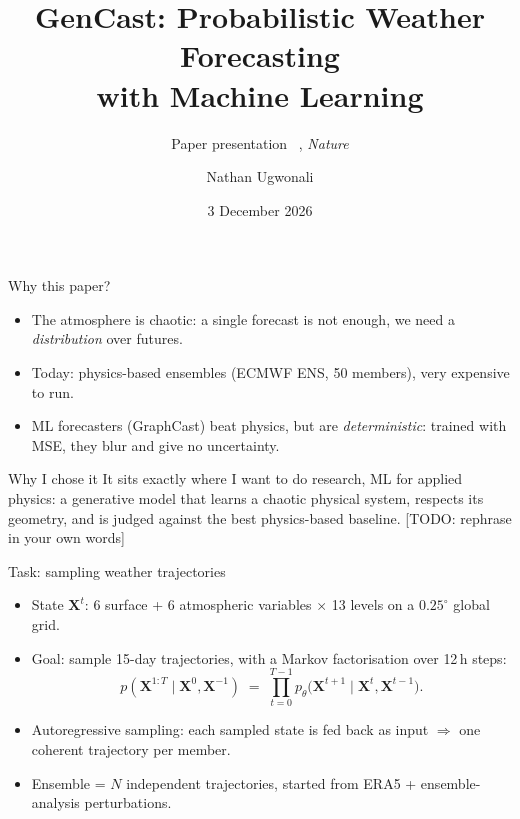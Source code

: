 \documentclass[aspectratio=169,11pt]{beamer}
\title[GenCast]{GenCast: Probabilistic Weather Forecasting\\with Machine Learning}
\subtitle{Paper presentation \textbar\ \citet{price2025gencast}, \emph{Nature}}
\author[N.\ Ugwonali]{Nathan Ugwonali}
\institute{MVA \textbar\ ALTEGRAD: Advanced Learning for Text and Graph Data}
\date{3 December 2026}
\newcommand{\verify}[1]{\colorbox{yellow!50}{#1}}
\newcommand{\todo}[1]{{\color{red}\footnotesize[TODO: #1]}}
\newcommand{\X}{\mathbf{X}}
\begin{document}
\begin{frame}[plain]
  \titlepage
\end{frame}

\begin{frame}{Why this paper?}
  \begin{itemize}
    \item The atmosphere is \alert{chaotic}: a single forecast is not enough, we need a \emph{distribution} over futures.
    \item Today: physics-based \alert{ensembles} (ECMWF ENS, \verify{50 members}), very expensive to run.
    \item ML forecasters (GraphCast) beat physics, but are \emph{deterministic}: trained with MSE, they blur and give no uncertainty.
  \end{itemize}
  \vfill
  \begin{block}{Why I chose it}
    It sits exactly where I want to do research, \alert{ML for applied physics}: a generative model that learns a chaotic physical system,
    respects its geometry, and is judged against the best physics-based baseline.
    \todo{rephrase in your own words}
  \end{block}
\end{frame}

\begin{frame}{Task: sampling weather trajectories}
  \begin{itemize}
    \item State $\X^t$: \verify{6 surface + 6 atmospheric variables $\times$ 13 levels} on a \verify{$0.25^\circ$} global grid.
    \item Goal: sample 15-day trajectories, with a Markov factorisation over \verify{12\,h} steps:
      \[
        p(\X^{1:T}\mid \X^{0},\X^{-1}) \;=\; \prod_{t=0}^{T-1} p_\theta\big(\X^{t+1} \mid \X^{t}, \X^{t-1}\big).
      \]
    \item \alert{Autoregressive sampling}: each sampled state is fed back as input $\Rightarrow$ one coherent trajectory per member.
    \item Ensemble = $N$ independent trajectories, started from \verify{ERA5 + ensemble-analysis perturbations}.
  \end{itemize}
\end{frame}
\end{document}
